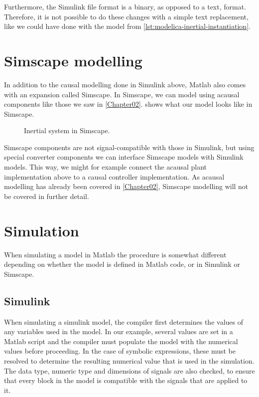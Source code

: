 \documentclass[\rootfolder/main.tex]{subfiles}
\begin{document}
Furthermore, the Simulink file format is a binary, as opposed to a text, format.
Therefore, it is not possible to do these changes with a simple text replacement, like we could have done with the model from \cref{lst:modelica-inertial-instantiation}.

\section{Simscape modelling}

In addition to the causal modelling done in Simulink above, Matlab also comes with an expansion called Simscape.
In Simscape, we can model using acausal components like those we saw in \cref{Chapter02}.
 shows what our model looks like in Simscape.

\begin{figure}[ht]
    \caption{Inertial system in Simscape.\label{fig:simscape-inertial}}
\end{figure}

Simscape components are not signal-compatible with those in Simulink, but using special converter components we can interface Simscape models with Simulink models.
This way, we might for example connect the acausal plant implementation above to a causal controller implementation.
As acausal modelling has already been covered in \cref{Chapter02}, Simscape modelling will not be covered in further detail.

\section{Simulation}

When simulating a model in Matlab the procedure is somewhat different depending on whether the model is defined in Matlab code, or in Simulink or Simscape.

\subsection{Simulink}

When simulating a simulink model, the compiler first determines the values of any variables used in the model.
In our example, several values are set in a Matlab script and the compiler must populate the model with the numerical values before proceeding.
In the case of symbolic expressions, these must be resolved to determine the resulting numerical value that is used in the simulation.
The data type, numeric type and dimensions of signals are also checked, to ensure that every block in the model is compatible with the signals that are applied to it.
\end{document}

